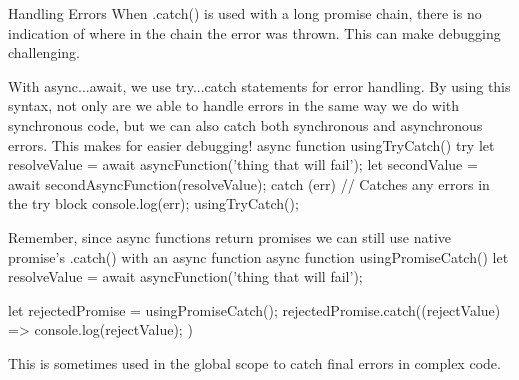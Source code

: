 Handling Errors
    When .catch() is used with a long promise chain, there is no indication of where in the chain the error was thrown. This can make debugging challenging.

    With async...await, we use try...catch statements for error handling. By using this syntax, not only are we able to handle errors in the same way we do with synchronous code, but we can also catch both synchronous and asynchronous errors. This makes for easier debugging!
        async function usingTryCatch() {
            try {
                let resolveValue = await asyncFunction('thing that will fail');
                let secondValue = await secondAsyncFunction(resolveValue);
            } catch (err) {
            // Catches any errors in the try block
                console.log(err);
            }
        }
        usingTryCatch();

    Remember, since async functions return promises we can still use native promise’s .catch() with an async function
        async function usingPromiseCatch() {
        let resolveValue = await asyncFunction('thing that will fail');
        }

        let rejectedPromise = usingPromiseCatch();
        rejectedPromise.catch((rejectValue) => {
        console.log(rejectValue);
        })
    
    This is sometimes used in the global scope to catch final errors in complex code.